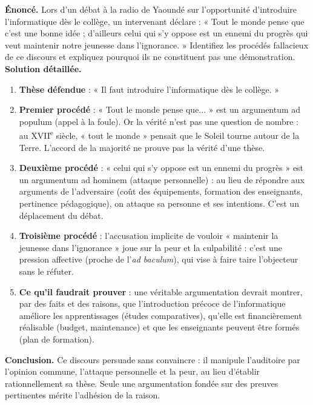 \documentclass[11pt]{article}
\newcommand{\cle}[1]{{\popxbold\color{popdark}#1}}
\begin{document}
\begin{exoresolu}
\textbf{Énoncé.} Lors d'un débat à la radio de Yaoundé sur l'opportunité d'introduire l'informatique dès le collège, un intervenant déclare : « Tout le monde pense que c'est une bonne idée ; d'ailleurs celui qui s'y oppose est un ennemi du progrès qui veut maintenir notre jeunesse dans l'ignorance. » Identifiez les procédés fallacieux de ce discours et expliquez pourquoi ils ne constituent pas une démonstration.
\tcblower
\textbf{Solution détaillée.}
\begin{enumerate}
\item \textbf{Thèse défendue} : « Il faut introduire l'informatique dès le collège. »
\item \textbf{Premier procédé} : « Tout le monde pense que... » est un \cle{argumentum ad populum} (appel à la foule). Or la vérité n'est pas une question de nombre : au XVII\textsuperscript{e} siècle, « tout le monde » pensait que le Soleil tourne autour de la Terre. L'accord de la majorité ne prouve pas la vérité d'une thèse.
\item \textbf{Deuxième procédé} : « celui qui s'y oppose est un ennemi du progrès » est un \cle{argumentum ad hominem} (attaque personnelle) : au lieu de répondre aux arguments de l'adversaire (coût des équipements, formation des enseignants, pertinence pédagogique), on attaque sa personne et ses intentions. C'est un déplacement du débat.
\item \textbf{Troisième procédé} : l'accusation implicite de vouloir « maintenir la jeunesse dans l'ignorance » joue sur la peur et la culpabilité : c'est une pression affective (proche de l'\emph{ad baculum}), qui vise à faire taire l'objecteur sans le réfuter.
\item \textbf{Ce qu'il faudrait prouver} : une véritable argumentation devrait montrer, par des faits et des raisons, que l'introduction précoce de l'informatique améliore les apprentissages (études comparatives), qu'elle est financièrement réalisable (budget, maintenance) et que les enseignants peuvent être formés (plan de formation).
\end{enumerate}
\textbf{Conclusion.} Ce discours persuade sans convaincre : il manipule l'auditoire par l'opinion commune, l'attaque personnelle et la peur, au lieu d'établir rationnellement sa thèse. Seule une argumentation fondée sur des preuves pertinentes mérite l'adhésion de la raison.
\end{exoresolu}
\end{document}
